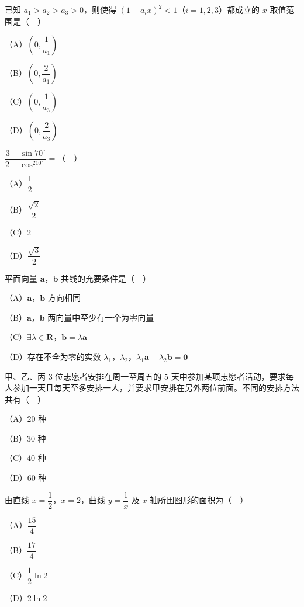 \begin{question}
已知 $a_1>a_2>a_3>0$，则使得 $(1-a_ix)^2<1$（$i=1,2,3$）都成立的 $x$ 取值范围是（　）

（A）$\left(0,\dfrac1{a_1}\right)$

（B）$\left(0,\dfrac2{a_1}\right)$

（C）$\left(0,\dfrac1{a_3}\right)$

（D）$\left(0,\dfrac2{a_3}\right)$

\end{question}
\begin{question}
$\dfrac{3-\sin70^\circ}{2-\cos^210^\circ}=$（　）

（A）$\dfrac12$

（B）$\dfrac{\sqrt2}2$

（C）$2$

（D）$\dfrac{\sqrt3}2$

\end{question}
\begin{question}
平面向量 $\boldsymbol a$，$\boldsymbol b$ 共线的充要条件是（　）

（A）$\boldsymbol a$，$\boldsymbol b$ 方向相同

（B）$\boldsymbol a$，$\boldsymbol b$ 两向量中至少有一个为零向量

（C）$\exists\lambda\in\mathbf R$，$\boldsymbol b=\lambda\boldsymbol a$

（D）存在不全为零的实数 $\lambda_1$，$\lambda_2$，$\lambda_1\boldsymbol a+\lambda_2\boldsymbol b=\boldsymbol 0$

\end{question}
\begin{question}
甲、乙、丙 $3$ 位志愿者安排在周一至周五的 $5$ 天中参加某项志愿者活动，要求每人参加一天且每天至多安排一人，并要求甲安排在另外两位前面。不同的安排方法共有（　）

（A）$20$ 种

（B）$30$ 种

（C）$40$ 种

（D）$60$ 种

\end{question}
\begin{question}
由直线 $x=\dfrac12$，$x=2$，曲线 $y=\dfrac1x$ 及 $x$ 轴所围图形的面积为（　）

（A）$\dfrac{15}4$

（B）$\dfrac{17}4$

（C）$\dfrac12\ln2$

（D）$2\ln2$

\end{question}

